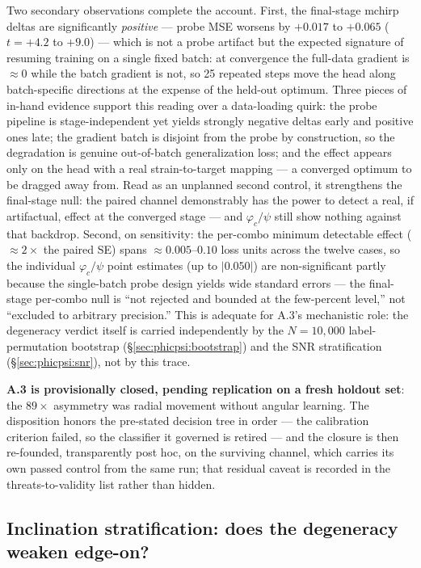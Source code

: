 \documentclass[11pt]{article}
\begin{document}
Two secondary observations complete the account.
First, the final-stage mchirp deltas are significantly \emph{positive} --- probe MSE worsens by $+0.017$ to $+0.065$ ($t = +4.2$ to $+9.0$) --- which is not a probe artifact but the expected signature of resuming training on a single fixed batch: at convergence the full-data gradient is ${\approx}0$ while the batch gradient is not, so 25 repeated steps move the head along batch-specific directions at the expense of the held-out optimum.
Three pieces of in-hand evidence support this reading over a data-loading quirk: the probe pipeline is stage-independent yet yields strongly negative deltas early and positive ones late; the gradient batch is disjoint from the probe by construction, so the degradation is genuine out-of-batch generalization loss; and the effect appears only on the head with a real strain-to-target mapping --- a converged optimum to be dragged away from.
Read as an unplanned second control, it strengthens the final-stage null: the paired channel demonstrably has the power to detect a real, if artifactual, effect at the converged stage --- and $\varphi_c/\psi$ still show nothing against that backdrop.
Second, on sensitivity: the per-combo minimum detectable effect (${\approx}2\times$ the paired SE) spans ${\approx}0.005$--$0.10$ loss units across the twelve cases, so the individual $\varphi_c/\psi$ point estimates (up to $|0.050|$) are non-significant partly because the single-batch probe design yields wide standard errors --- the final-stage per-combo null is ``not rejected and bounded at the few-percent level,'' not ``excluded to arbitrary precision.''
This is adequate for A.3's mechanistic role: the degeneracy verdict itself is carried independently by the $N = 10{,}000$ label-permutation bootstrap (\S\ref{sec:phicpsi:bootstrap}) and the SNR stratification (\S\ref{sec:phicpsi:snr}), not by this trace.

\textbf{A.3 is provisionally closed, pending replication on a fresh holdout set}: the $89\times$ asymmetry was radial movement without angular learning.
The disposition honors the pre-stated decision tree in order --- the calibration criterion failed, so the classifier it governed is retired --- and the closure is then re-founded, transparently post hoc, on the surviving channel, which carries its own passed control from the same run; that residual caveat is recorded in the threats-to-validity list rather than hidden.

\subsection{Inclination stratification: does the degeneracy weaken edge-on?}
\label{sec:phicpsi:inclination}
\end{document}
